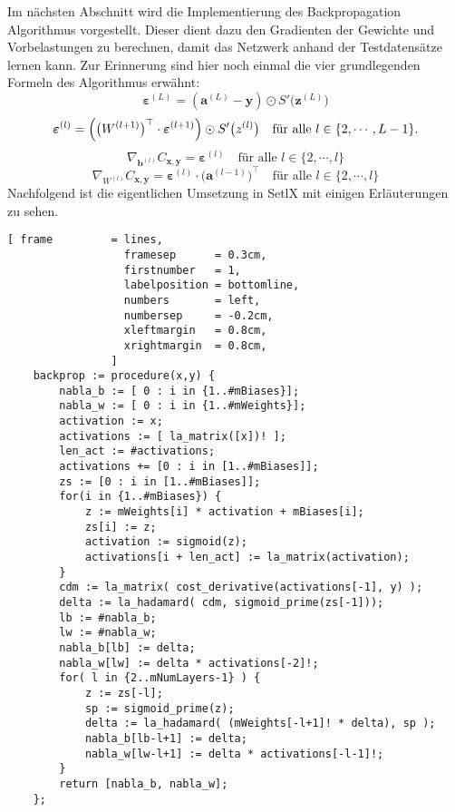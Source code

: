 \noindent
Im nächsten Abschnitt wird die Implementierung des Backpropagation Algorithmus vorgestellt. Dieser dient dazu den Gradienten der Gewichte und Vorbelastungen zu berechnen, damit das Netzwerk anhand der Testdatensätze lernen kann. Zur Erinnerung sind hier noch einmal die vier grundlegenden Formeln des Algorithmus erwähnt:
\begin{equation} \label{eq:BP1_impl}
	\boldsymbol{\varepsilon}^{(L)} = (\mathbf{a}^{(L)} - \mathbf{y}) \odot S'\bigl(\mathbf{z}^{(L)}\bigr)  
\end{equation}
\begin{equation} \label{eq:BP2_impl}
	\boldsymbol{\varepsilon}^{(l)} = \Bigl(\bigl(W^{(l+1)}\bigr)^\top \cdot \boldsymbol{\varepsilon}^{(l+1)}\Bigr) \odot
  S'\bigl(z^{(l)}\bigr) \quad \mbox{für alle $l \in \{2, \cdots, L-1\}$}.
\end{equation}
\begin{equation} \label{eq:BP3_impl}
	\nabla_{\mathbf{b}^{(l)}} C_{\mathbf{x}, \mathbf{y}} = \boldsymbol{\varepsilon}^{(l)}
  \quad \mbox{für alle $l \in \{2, \cdots,l\}$}
\end{equation}
\begin{equation} \label{eq:BP4_impl}
	\nabla_{W^{(l)}} C_{\mathbf{x}, \mathbf{y}} = \boldsymbol{\varepsilon}^{(l)} \cdot \bigl(\mathbf{a}^{(l-1)}\bigr)^\top
  \quad \mbox{für alle $l \in \{2, \cdots,l\}$}
\end{equation}
Nachfolgend ist die eigentlichen Umsetzung in SetlX mit einigen Erläuterungen zu sehen.
\begin{Verbatim}[ frame         = lines, 
                  framesep      = 0.3cm, 
                  firstnumber   = 1,
                  labelposition = bottomline,
                  numbers       = left,
                  numbersep     = -0.2cm,
                  xleftmargin   = 0.8cm,
                  xrightmargin  = 0.8cm,
                ]
    backprop := procedure(x,y) {
        nabla_b := [ 0 : i in {1..#mBiases}];
        nabla_w := [ 0 : i in {1..#mWeights}];
        activation := x;
        activations := [ la_matrix([x])! ];
        len_act := #activations;
        activations += [0 : i in [1..#mBiases]];
        zs := [0 : i in [1..#mBiases]];		
        for(i in {1..#mBiases}) {
            z := mWeights[i] * activation + mBiases[i];
            zs[i] := z;	
            activation := sigmoid(z);
            activations[i + len_act] := la_matrix(activation);
        }
        cdm := la_matrix( cost_derivative(activations[-1], y) );
        delta := la_hadamard( cdm, sigmoid_prime(zs[-1]));
        lb := #nabla_b;
        lw := #nabla_w;
        nabla_b[lb] := delta;	
        nabla_w[lw] := delta * activations[-2]!;				
        for( l in {2..mNumLayers-1} ) {
            z := zs[-l];
            sp := sigmoid_prime(z);	
            delta := la_hadamard( (mWeights[-l+1]! * delta), sp );
            nabla_b[lb-l+1] := delta;
            nabla_w[lw-l+1] := delta * activations[-l-1]!;
        }
        return [nabla_b, nabla_w];
    };
\end{Verbatim}
